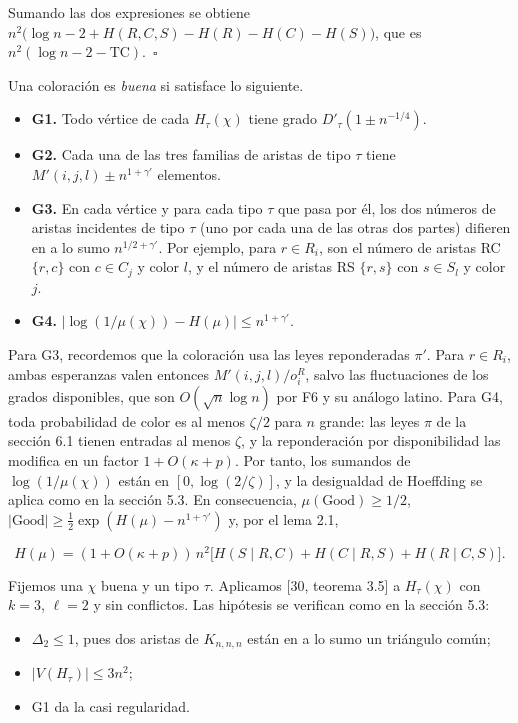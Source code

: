 \documentclass[spanish,11pt,a4paper]{article}
\providecommand{\tightlist}{\setlength{\itemsep}{0pt}\setlength{\parskip}{0pt}}
\begin{document}
Sumando las dos expresiones se obtiene \(n^2\bigl(\log n-2+H(R,C,S)-H(R)-H(C)-H(S)\bigr)\), que es \(n^2(\log n-2-\mathrm{TC})\).~\(\square\)

Una coloración es \emph{buena} si satisface lo siguiente.

\begin{itemize}
\tightlist
\item
  \textbf{G1.} Todo vértice de cada \(H_\tau(\chi)\) tiene grado \(D'_\tau(1\pm n^{-1/4})\).
\item
  \textbf{G2.} Cada una de las tres familias de aristas de tipo \(\tau\) tiene \(M'(i,j,l)\pm n^{1+\gamma'}\) elementos.
\item
  \textbf{G3.} En cada vértice y para cada tipo \(\tau\) que pasa por él, los dos números de aristas incidentes de tipo \(\tau\) (uno por cada una de las otras dos partes) difieren en a lo sumo \(n^{1/2+\gamma'}\). Por ejemplo, para \(r\in R_i\), son el número de aristas RC \(\{r,c\}\) con \(c\in C_j\) y color \(l\), y el número de aristas RS \(\{r,s\}\) con \(s\in S_l\) y color \(j\).
\item
  \textbf{G4.} \(\bigl|\log(1/\mu(\chi))-H(\mu)\bigr|\le n^{1+\gamma'}\).
\end{itemize}

Para G3, recordemos que la coloración usa las leyes reponderadas \(\pi'\). Para \(r\in R_i\), ambas esperanzas valen entonces \(M'(i,j,l)/o^R_i\), salvo las fluctuaciones de los grados disponibles, que son \(O(\sqrt n\log n)\) por F6 y su análogo latino. Para G4, toda probabilidad de color es al menos \(\zeta/2\) para \(n\) grande: las leyes \(\pi\) de la sección 6.1 tienen entradas al menos \(\zeta\), y la reponderación por disponibilidad las modifica en un factor \(1+O(\kappa+p)\). Por tanto, los sumandos de \(\log(1/\mu(\chi))\) están en \([0,\log(2/\zeta)]\), y la desigualdad de Hoeffding se aplica como en la sección 5.3. En consecuencia, \(\mu(\mathrm{Good})\ge1/2\), \(|\mathrm{Good}|\ge\frac12\exp(H(\mu)-n^{1+\gamma'})\) y, por el lema 2.1,

\nopagebreak[4]
\[H(\mu)=(1+O(\kappa+p))\,n^2\bigl[H(S\mid R,C)+H(C\mid R,S)+H(R\mid C,S)\bigr].\]

Fijemos una \(\chi\) buena y un tipo \(\tau\). Aplicamos {[}30, teorema 3.5{]} a \(H_\tau(\chi)\) con \(k=3\), \(\ell=2\) y sin conflictos. Las hipótesis se verifican como en la sección 5.3:

\begin{itemize}
\tightlist
\item
  \(\Delta_2\le1\), pues dos aristas de \(K_{n,n,n}\) están en a lo sumo un triángulo común;
\item
  \(|V(H_\tau)|\le3n^2\);
\item
  G1 da la casi regularidad.
\end{itemize}
\end{document}
